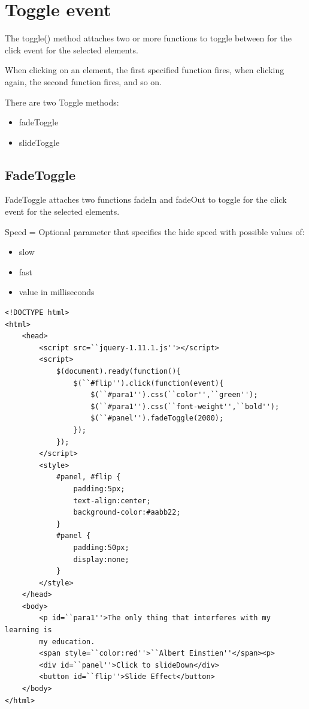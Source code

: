 \documentclass[11pt,a4paper]{article}
\begin{document}
\section*{Toggle event}
The toggle() method attaches two or more functions to toggle between for the click event for the selected elements.

When clicking on an element, the first specified function fires, when clicking again, the second function fires, and so on.

There are two Toggle methods:
\begin{itemize}
 \item fadeToggle
 \item slideToggle
\end{itemize}
\subsection*{FadeToggle}
FadeToggle attaches two functions fadeIn and fadeOut to toggle for the click event for the selected elements.

Speed = Optional parameter that specifies the hide speed with possible values of:
\begin{itemize}
 \item slow
 \item fast
 \item value in milliseconds
\end{itemize}

\begin{lstlisting}
<!DOCTYPE html>
<html>
    <head>
        <script src=``jquery-1.11.1.js''></script>
        <script>
            $(document).ready(function(){
                $(``#flip'').click(function(event){
                    $(``#para1'').css(``color'',``green'');
                    $(``#para1'').css(``font-weight'',``bold'');
                    $(``#panel'').fadeToggle(2000);
                });
            });
        </script>
        <style>
            #panel, #flip {
                padding:5px;
                text-align:center;
                background-color:#aabb22;
            }
            #panel {
                padding:50px;
                display:none;
            }
        </style>
    </head>
    <body>
        <p id=``para1''>The only thing that interferes with my learning is
        my education.
        <span style=``color:red''>``Albert Einstien''</span><p>
        <div id=``panel''>Click to slideDown</div>
        <button id=``flip''>Slide Effect</button>
    </body>
</html> 
\end{lstlisting}
\end{document}
